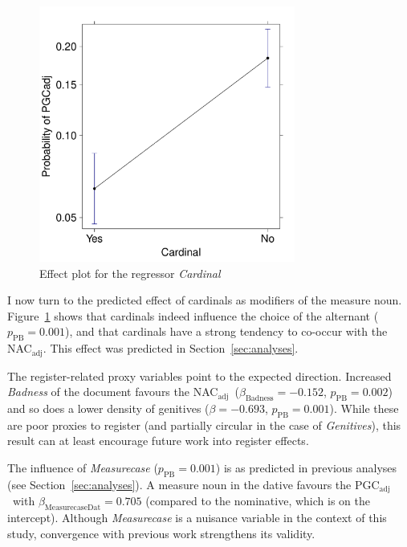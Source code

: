 \documentclass[USenglish]{article}
\newcommand{\Sub}[1]{\ensuremath{\mathrm{_{#1}}}}
\newcommand{\mpPB}{\ensuremath{p_{\text{PB}}}}
\newcommand{\NACa}{NAC\Sub{adj}}
\newcommand{\PGCa}{PGC\Sub{adj}}
\begin{document}

\begin{figure}[h!]
  \centering
  \includegraphics[width=0.75\textwidth]{../R/output/corpus_Cardinal}
  \caption{Effect plot for the regressor \textit{Cardinal}}
  \label{fig:eff:leftcontext}
\end{figure}

I now turn to the predicted effect of cardinals as modifiers of the measure noun.
Figure~\ref{fig:eff:leftcontext} shows that cardinals indeed influence the choice of the alternant ($\mpPB=0.001$), and that cardinals have a strong tendency to co-occur with the \NACa.
This effect was predicted in Section~\ref{sec:analyses}.


The register-related proxy variables point to the expected direction.
Increased \textit{Badness} of the document favours the \NACa\ ($\beta_{\text{Badness}}=-0.152$, $\mpPB=0.002$) and so does a lower density of genitives ($\beta=-0.693$, $\mpPB=0.001$).
While these are poor proxies to register (and partially circular in the case of \textit{Genitives}), this result can at least encourage future work into register effects. 


The influence of \textit{Measurecase} ($\mpPB=0.001$) is as predicted in previous analyses (see Section~\ref{sec:analyses}).
A measure noun in the dative favours the \PGCa\ with $\beta_{\text{MeasurecaseDat}}=0.705$ (compared to the nominative, which is on the intercept).
Although \textit{Measurecase} is a nuisance variable in the context of this study, convergence with previous work strengthens its validity.
\end{document}
